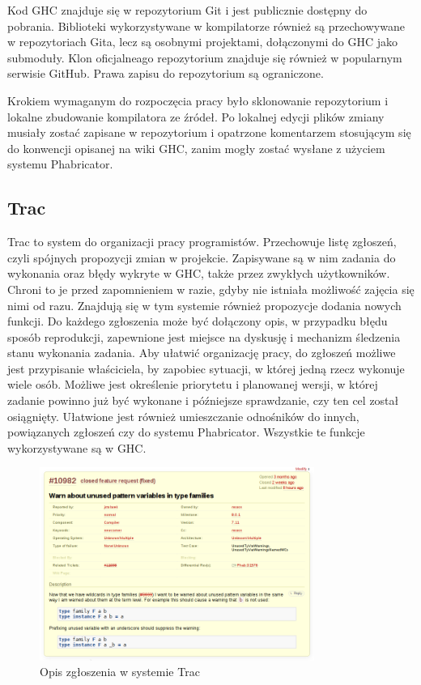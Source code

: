 Kod GHC znajduje się w repozytorium Git i jest publicznie dostępny do
pobrania. Biblioteki wykorzystywane w kompilatorze również są przechowywane w
repozytoriach Gita, lecz są osobnymi projektami, dołączonymi do GHC jako
submoduły. Klon oficjalneago repozytorium znajduje się również w popularnym
serwisie GitHub. Prawa zapisu do repozytorium są
ograniczone\cite{WikiGettingTheSources}.

Krokiem wymaganym do rozpoczęcia pracy było sklonowanie repozytorium i lokalne
zbudowanie kompilatora ze źródeł. Po lokalnej edycji plików zmiany musiały
zostać zapisane w repozytorium i opatrzone komentarzem stosującym się do
konwencji opisanej na wiki GHC, zanim mogły zostać wysłane z użyciem systemu
Phabricator.

\subsection{Trac}

Trac to system do organizacji pracy programistów. Przechowuje listę zgłoszeń,
czyli spójnych propozycji zmian w projekcie. Zapisywane są w nim zadania do
wykonania oraz błędy wykryte w GHC, także przez zwykłych użytkowników. Chroni to
je przed zapomnieniem w razie, gdyby nie istniała możliwość zajęcia się nimi od
razu. Znajdują się w tym systemie również propozycje dodania nowych funkcji. Do
każdego zgłoszenia może być dołączony opis, w przypadku błędu sposób
reprodukcji, zapewnione jest miejsce na dyskusję i mechanizm śledzenia stanu
wykonania zadania. Aby ułatwić organizację pracy, do zgłoszeń możliwe jest
przypisanie właściciela, by zapobiec sytuacji, w której jedną rzecz wykonuje
wiele osób. Możliwe jest określenie priorytetu i planowanej wersji, w której
zadanie powinno już być wykonane i późniejsze sprawdzanie, czy ten cel został
osiągnięty. Ułatwione jest również umieszczanie odnośników do innych,
powiązanych zgłoszeń czy do systemu Phabricator. Wszystkie te funkcje
wykorzystywane są w GHC.

\begin{figure}[ht]
    \centering
    \includegraphics[width=0.8\textwidth]{images/Trac_description}
    \caption{Opis zgłoszenia w systemie Trac}
    \label{fig:Trac_description}
\end{figure}

